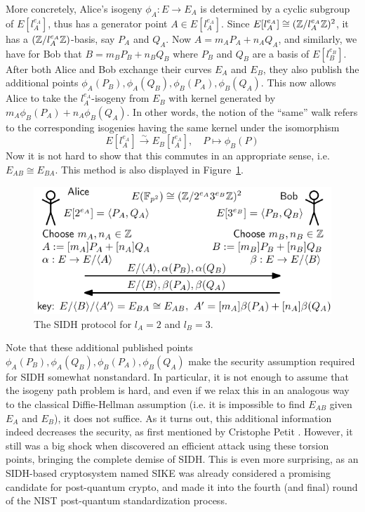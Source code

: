 More concretely, Alice's isogeny $\phi_A: E \to E_A$ is determined by a cyclic subgroup of $E[l_A^{e_A}]$, thus has a generator point $A \in E[l_A^{e_A}]$.
Since $E[l_A^{e_A}] \cong (\mathbb{Z}/l_A^{e_A}\mathbb{Z})^2$, it has a $(\mathbb{Z}/l_A^{e_A}\mathbb{Z})$-basis, say $P_A$ and $Q_A$.
Now $A = m_A P_A + n_A Q_A$, and similarly, we have for Bob that $B = m_B P_B + n_B Q_B$ where $P_B$ and $Q_B$ are a basis of $E[l_B^{e_B}]$.
After both Alice and Bob exchange their curves $E_A$ and $E_B$, they also publish the additional points $\phi_A(P_B), \phi_A(Q_B), \phi_B(P_A), \phi_B(Q_A)$.
This now allows Alice to take the $l_A^{e_A}$-isogeny from $E_B$ with kernel generated by $m_A \phi_B(P_A) + n_A \phi_B(Q_A)$.
In other words, the notion of the ``same'' walk refers to the corresponding isogenies having the same kernel under the isomorphism
\begin{equation*}
    E[l_A^{e_A}] \overset{\sim}{\longrightarrow} E_B[l_A^{e_A}], \quad P \mapsto \phi_B(P)
\end{equation*}
Now it is not hard to show that this commutes in an appropriate sense, i.e. $E_{AB} \cong E_{BA}$.
This method is also displayed in Figure~\ref{fig:sidh}.
\begin{figure}
    \includegraphics[width = \textwidth]{./sidh.pdf}
    \caption{\label{fig:sidh} The SIDH protocol for $l_A = 2$ and $l_B = 3$.}
\end{figure}

Note that these additional published points $\phi_A(P_B), \phi_A(Q_B), \phi_B(P_A), \phi_B(Q_A)$ make the security assumption required for SIDH somewhat nonstandard.
In particular, it is not enough to assume that the isogeny path problem is hard, and even if we relax this in an analogous way to the classical Diffie-Hellman assumption (i.e. it is impossible to find $E_{AB}$ given $E_A$ and $E_B$), it does not suffice.
As it turns out, this additional information indeed decreases the security, as first mentioned by Cristophe Petit \cite{torsion_point_attack}.
However, it still was a big shock when \cite{sidh_broken} discovered an efficient attack using these torsion points, bringing the complete demise of SIDH.
This is even more surprising, as an SIDH-based cryptosystem named SIKE \cite{sike} was already considered a promising candidate for post-quantum crypto, and made it into the fourth (and final) round of the NIST post-quantum standardization process.

